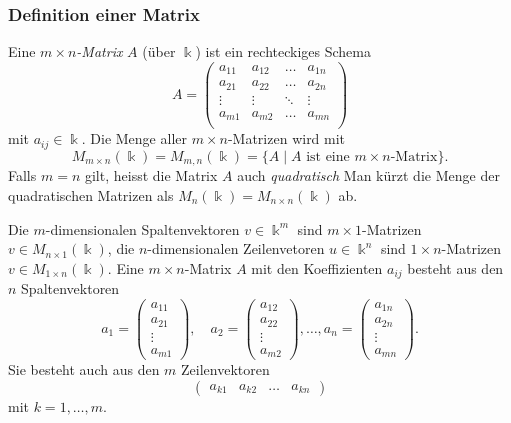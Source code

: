 \subsubsection{Definition einer Matrix}
\begin{definition}
Eine {\em $m\times n$-Matrix} $A$ (über $\Bbbk$) ist ein rechteckiges Schema
%
\[
A
=
\begin{pmatrix}
a_{11}&a_{12}&\dots &a_{1n}\\
a_{21}&a_{22}&\dots &a_{2n}\\
\vdots&\vdots&\ddots&\vdots\\
a_{m1}&a_{m2}&\dots &a_{mn}\\
\end{pmatrix}
\]
mit $a_{i\!j}\in\Bbbk$.
Die Menge aller $m\times n$-Matrizen wird mit
\[
M_{m\times n}(\Bbbk)
=
M_{m,n}(\Bbbk)
=
\{ A\;|\; \text{$A$ ist eine $m\times n$-Matrix}\}.
\]
Falls $m=n$ gilt, heisst die Matrix $A$ auch {\em quadratisch}
%
Man kürzt die Menge der quadratischen Matrizen als
$M_n(\Bbbk) = M_{n\times n}(\Bbbk)$ ab.
\end{definition}

Die $m$-dimensionalen Spaltenvektoren $v\in \Bbbk^m$ sind $m\times 1$-Matrizen
$v\in M_{n\times 1}(\Bbbk)$, die $n$-dimensionalen Zeilenvetoren $u\in\Bbbk^n$
sind $1\times n$-Matrizen $v\in M_{1\times n}(\Bbbk)$.
Eine $m\times n$-Matrix $A$ mit den Koeffizienten $a_{i\!j}$ besteht aus
den $n$ Spaltenvektoren
\[
a_1 = \begin{pmatrix} a_{11} \\ a_{21} \\ \vdots \\ a_{m1} \end{pmatrix},\quad
a_2 = \begin{pmatrix} a_{12} \\ a_{22} \\ \vdots \\ a_{m2} \end{pmatrix},\dots,
a_n = \begin{pmatrix} a_{1n} \\ a_{2n} \\ \vdots \\ a_{mn} \end{pmatrix}.
\]
Sie besteht auch aus den $m$ Zeilenvektoren
\[
\begin{pmatrix} a_{k1} & a_{k2} & \dots & a_{kn} \end{pmatrix}
\]
mit $k=1,\dots,m$.

